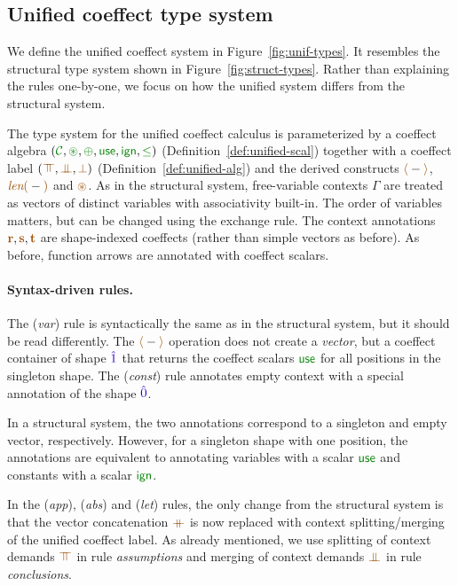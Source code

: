\subsection{Unified coeffect type system}
\label{sec:further-types}
We define the unified coeffect system in Figure~\ref{fig:unif-types}. It resembles the structural
type system shown in Figure~\ref{fig:struct-types}. Rather than explaining the rules one-by-one, we
focus on how the unified system differs from the structural system.

The type system for the unified coeffect calculus is parameterized by a coeffect algebra
$(\C, \cseq, \cpar, \cunit, \czero, \cleq)$ (Definition~\ref{def:unified-scal}) together with a
coeffect label $(\azip, \apar, \azero)$ (Definition~\ref{def:unified-alg})
and the derived constructs $\alift{-}$, $\alen{-}$ and $\aseq$.
As in the structural system, free-variable contexts $\Gamma$ are treated as vectors of distinct
variables with associativity built-in. The order of variables matters, but can be changed
using the exchange rule. The context annotations $\aclrd{\textbf{r}}, \aclrd{\textbf{s}}, \aclrd{\textbf{t}}$
are shape-indexed coeffects (rather than simple vectors as before). As before, function arrows
are annotated with coeffect scalars.

\paragraph{Syntax-driven rules.}
The (\emph{var}) rule is syntactically the same as in the structural system, but it should be read
differently. The $\alift{-}$ operation does not create a \emph{vector}, but a coeffect container
of shape $\sunit$ that returns the coeffect scalars $\cunit$ for all positions in the singleton shape.
The (\emph{const}) rule annotates empty context with a special annotation of the shape $\sempty$.

In a structural system, the two annotations correspond to a singleton and empty vector, respectively.
However, for a singleton shape with one position, the annotations are equivalent to annotating
variables with a scalar $\cunit$ and constants with a scalar $\czero$.

In the (\emph{app}), (\emph{abs}) and (\emph{let}) rules, the only change from the structural
system is that the vector concatenation $\atimes$ is now replaced with context splitting/merging
of the unified coeffect label. As already mentioned, we use splitting of context demands $\azip$
in rule \emph{assumptions} and merging of context demands $\apar$ in rule \emph{conclusions}.

